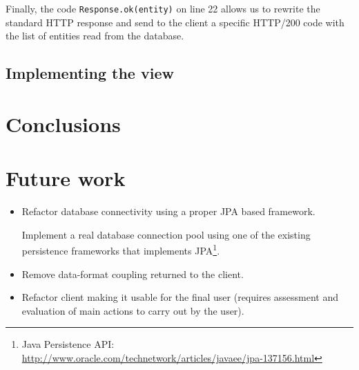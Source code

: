 Finally, the code \texttt{Response.ok(entity)} on line 22 allows us to rewrite
the standard HTTP response and send to the client a specific HTTP/200 code with the
list of entities read from the database.

\section{Implementing the view}

\chapter{Conclusions}

\chapter{Future work}
\begin{itemize}
	\item Refactor database connectivity using a proper JPA based framework.
  
	Implement a real database connection pool using one of the existing persistence
	frameworks that implements JPA\footnote{Java Persistence API:
	\url{http://www.oracle.com/technetwork/articles/javaee/jpa-137156.html}}.
	
	\item Remove data-format coupling returned to the client.
	\item Refactor client making it usable for the final user (requires assessment
	and evaluation of main actions to carry out by the user).
\end{itemize}

%
